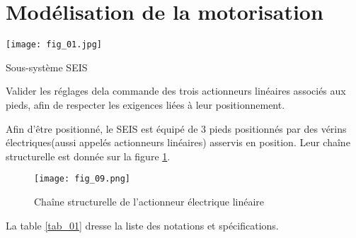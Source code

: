 \section{Modélisation de la motorisation}
\begin{marginfigure}
\texttt{[image: fig\_01.jpg]}
\caption{Sous-système SEIS \label{fig_01}}
\end{marginfigure}

\begin{obj}
Valider les réglages dela commande des trois actionneurs linéaires associés aux pieds, afin de respecter les exigences liées à leur positionnement.
\end{obj}

%
%



Afin d'être positionné, le SEIS est équipé de 3 pieds positionnés par des vérins électriques(aussi appelés actionneurs linéaires) asservis en position. Leur chaîne structurelle est donnée sur la figure \ref{fig_09}.

\begin{figure}[!h]
\centering
\texttt{[image: fig\_09.png]}
\caption{Chaîne structurelle de l’actionneur électrique linéaire \label{fig_09}}
\end{figure}


La table \ref{tab_01} dresse la liste des notations et spécifications. 

